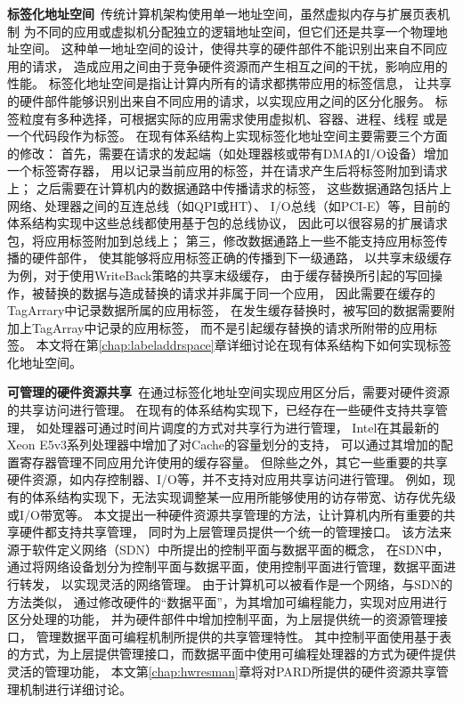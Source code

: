 \textbf{标签化地址空间}\ 传统计算机架构使用单一地址空间，虽然虚拟内存与扩展页表机制
为不同的应用或虚拟机分配独立的逻辑地址空间，但它们还是共享一个物理地址空间。
这种单一地址空间的设计，使得共享的硬件部件不能识别出来自不同应用的请求，
造成应用之间由于竞争硬件资源而产生相互之间的干扰，影响应用的性能。
标签化地址空间是指让计算内所有的请求都携带应用的标签信息，
让共享的硬件部件能够识别出来自不同应用的请求，以实现应用之间的区分化服务。
标签粒度有多种选择，可根据实际的应用需求使用虚拟机、容器、进程、线程
或是一个代码段作为标签。
在现有体系结构上实现标签化地址空间主要需要三个方面的修改：
首先，需要在请求的发起端（如处理器核或带有DMA的I/O设备）增加一个标签寄存器，
用以记录当前应用的标签，并在请求产生后将标签附加到请求上；
之后需要在计算机内的数据通路中传播请求的标签，
这些数据通路包括片上网络、处理器之间的互连总线（如QPI或HT）、
I/O总线（如PCI-E）等，目前的体系结构实现中这些总线都使用基于包的总线协议，
因此可以很容易的扩展请求包，将应用标签附加到总线上；
第三，修改数据通路上一些不能支持应用标签传播的硬件部件，
使其能够将应用标签正确的传播到下一级通路，
以共享末级缓存为例，对于使用WriteBack策略的共享末级缓存，
由于缓存替换所引起的写回操作，被替换的数据与造成替换的请求并非属于同一个应用，
因此需要在缓存的TagArrary中记录数据所属的应用标签，
在发生缓存替换时，被写回的数据需要附加上TagArray中记录的应用标签，
而不是引起缓存替换的请求所附带的应用标签。
本文将在第\ref{chap:labeladdrspace}章详细讨论在现有体系结构下如何实现标签化地址空间。


\textbf{可管理的硬件资源共享}\ 在通过标签化地址空间实现应用区分后，需要对硬件资源的共享访问进行管理。
在现有的体系结构实现下，已经存在一些硬件支持共享管理，
如处理器可通过时间片调度的方式对共享行为进行管理，
Intel在其最新的Xeon E5v3系列处理器中增加了对Cache的容量划分的支持\cite{intel-cat}，
可以通过其增加的配置寄存器管理不同应用允许使用的缓存容量。
但除些之外，其它一些重要的共享硬件资源，如内存控制器、I/O等，并不支持对应用共享访问进行管理。
例如，现有的体系结构实现下，无法实现调整某一应用所能够使用的访存带宽、访存优先级或I/O带宽等。
本文提出一种硬件资源共享管理的方法，让计算机内所有重要的共享硬件都支持共享管理，
同时为上层管理员提供一个统一的管理接口。
该方法来源于软件定义网络（SDN）中所提出的控制平面与数据平面的概念，
在SDN中，通过将网络设备划分为控制平面与数据平面，使用控制平面进行管理，数据平面进行转发，
以实现灵活的网络管理。
由于计算机可以被看作是一个网络，与SDN的方法类似，
通过修改硬件的``数据平面''，为其增加可编程能力，实现对应用进行区分处理的功能，
并为硬件部件中增加控制平面，为上层提供统一的资源管理接口，
管理数据平面可编程机制所提供的共享管理特性。
其中控制平面使用基于表的方式，为上层提供管理接口，而数据平面中使用可编程处理器的方式为硬件提供灵活的管理功能，
本文第\ref{chap:hwresman}章将对PARD所提供的硬件资源共享管理机制进行详细讨论。


